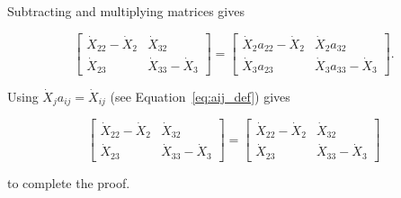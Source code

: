 \noindent Subtracting and multiplying matrices gives

\begin{equation} \label{eq:Xdifference1Proof-3}
	\begin{bmatrix} 	
		\dot{X}_{22} - \dot{X}_{2} & \dot{X}_{32}	\\
		\dot{X}_{23}               & \dot{X}_{33} - \dot{X}_{3}
	\end{bmatrix}
	=
	\begin{bmatrix} 	
		\dot{X}_{2} a_{22} - \dot{X}_{2} & \dot{X}_{2} a_{32}	\\
		\dot{X}_{3} a_{23}               & \dot{X}_{3} a_{33} - \dot{X}_{3}
	\end{bmatrix}.
\end{equation}

\noindent Using $\dot{X}_j a_{ij} = \dot{X}_{ij}$ (see Equation~\ref{eq:aij_def}) gives

\begin{equation} \label{eq:Xdifference1Proof-4}
	\begin{bmatrix} 	
		\dot{X}_{22} - \dot{X}_{2} & \dot{X}_{32}	\\
		\dot{X}_{23}               & \dot{X}_{33} - \dot{X}_{3}
	\end{bmatrix} 
	= 
	\begin{bmatrix} 	
		\dot{X}_{22} - \dot{X}_{2} & \dot{X}_{32}	\\
		\dot{X}_{23}               & \dot{X}_{33} - \dot{X}_{3}
	\end{bmatrix}
\end{equation}

\noindent to complete the proof.


